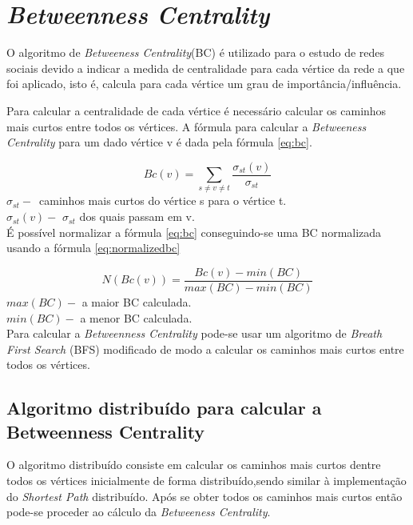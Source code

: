 \section{\textit{Betweenness Centrality}}

O algoritmo de \textit{Betweeness Centrality}(BC) é utilizado para o 
estudo de redes sociais devido a indicar a medida de centralidade para cada 
vértice da rede a que foi aplicado, isto é, calcula para cada vértice um grau de 
importância/influência. 

Para calcular a centralidade de cada vértice é necessário calcular os 
caminhos mais curtos entre todos os vértices. A fórmula para calcular a 
\textit{Betweeness Centrality} para um dado vértice v é dada pela fórmula 
\ref{eq:bc}.

\begin{equation}
	Bc(v) = \sum\limits_{s \neq v \neq t} 
\frac{\sigma_{st}(v)}{\sigma_{st}}
	\label{eq:bc}
\end{equation}
$\sigma_{st}-$~caminhos mais curtos do vértice s para o vértice t.\\
$\sigma_{st}(v)-$ $\sigma_{st}$ dos quais passam em v.\\

É possível normalizar a  fórmula \ref{eq:bc} conseguindo-se uma BC normalizada usando a fórmula 
\ref{eq:normalizedbc}

\begin{equation}
	N(Bc(v)) = \frac{Bc(v) - min(BC)}{max(BC)-min(BC)} 
	\label{eq:normalizedbc}
\end{equation}
$max(BC)-$ a maior BC calculada.\\
$min(BC)-$ a menor BC calculada.\\

Para calcular a \textit{Betweenness Centrality} pode-se usar um algoritmo de 
\textit{Breath First Search} (BFS) modificado de modo a calcular os caminhos 
mais curtos entre todos os vértices. 

\subsection{Algoritmo distribuído para calcular a Betweenness Centrality}
O algoritmo distribuído consiste em calcular os caminhos mais curtos dentre todos os vértices inicialmente de forma distribuído,sendo similar à implementação do 
\textit{Shortest Path} distribuído. Após se obter todos os caminhos mais curtos 
então pode-se proceder ao cálculo da \textit{Betweeness Centrality}. 

